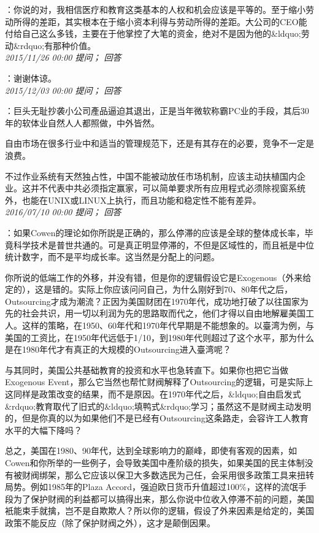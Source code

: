 \documentclass[twocolumn]{ctexart}
\begin{document}
：你说的对，我相信医疗和教育这类基本的人权和机会应该是平等的。至于缩小劳动所得的差距，其实根本在于缩小资本利得与劳动所得的差距。大公司的CEO能付给自己这么多钱，主要在于他掌控了大笔的资金，绝对不是因为他的\&ldquo;劳动\&rdquo;有那种价值。\\

\textit{\hfill\noindent\small 2015/11/26 00:00 提问； 回答}

：谢谢体谅。\\

\textit{\hfill\noindent\small 2015/12/03 00:00 提问； 回答}

：巨头无耻抄袭小公司產品逼迫其退出，正是当年微软称霸PC业的手段，其后30年的软体业自然人人都照做，中外皆然。

自由市场在很多行业中和适当的管理规范下，还是有其存在的必要，竞争不一定是浪费。

不过作业系统有天然独占性，中国不能被动放任市场机制，应该主动扶植国内企业。这并不代表中共必须指定赢家，可以简单要求所有应用程式必须除视窗系统外，也能在UNIX或LINUX上执行，而且功能和稳定性不能有差异。\\

\textit{\hfill\noindent\small 2016/07/10 00:00 提问； 回答}

：如果Cowen的理论如你所説是正确的，那么停滞的应该是全球的整体成长率，毕竟科学技术是普世共通的。可是真正明显停滞的，不但是区域性的，而且衹是中位统计数字，而不是平均成长率。这当然是分配上的问题。

你所说的低端工作的外移，并没有错，但是你的逻辑假设它是Exogenous（外来给定的），这是错的。实际上你应该问问自己，为什么刚好到70、80年代之后，Outsourcing才成为潮流？正因为美国财团在1970年代，成功地打破了以往国家为先的社会共识，用一切以利润为先的思路取而代之，他们才得以自由地解雇美国工人。这样的策略，在1950、60年代和1970年代早期是不能想象的。以臺湾为例，与美国的工资比，在1950年代远低于1/10，到1980年代则超过了这个水平，那为什么是在1980年代才有真正的大规模的Outsourcing进入臺湾呢？

与其同时，美国公共基础教育的投资和水平也急转直下。如果你也把它当做Exogenous Event，那么它当然也帮忙财阀解释了Outsourcing的逻辑，可是实际上这同样是政策改变的结果，而不是原因。在1970年代之后，\&ldquo;自由启发式\&rdquo;教育取代了旧式的\&ldquo;填鸭式\&rdquo;学习；虽然这不是财阀主动发明的，但是你真的以为如果他们不是已经有Outsourcing这条路走，会容许工人教育水平的大幅下降吗？

总之，美国在1980、90年代，达到全球影响力的巅峰，即使有客观的因素，如Cowen和你所举的一些例子，会导致美国中產阶级的损失，如果美国的民主体制没有被财阀绑架，那么它应该以保卫大多数选民为己任，会采用很多政策工具来扭转局势。例如1985年的Plaza Accord，强迫欧日货币升值超过100\%，这样的流氓手段为了保护财阀的利益都可以搞得出来，那么你说中位收入停滞不前的问题，美国衹能束手就擒，岂不是自欺欺人？所以你的逻辑，假设了外来因素是给定的，美国政策不能反应（除了保护财阀之外），这才是颠倒因果。\\
\end{document}
